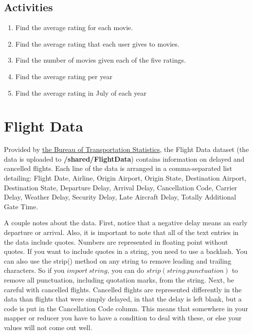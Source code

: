 \documentclass[letterpaper,10pt,openany,oneside]{sphinxmanual}
\begin{document}
\subsection{Activities}
\label{WmrActivities/WmrActivities:id2}\begin{enumerate}
\item {} 
Find the average rating for each movie.

\item {} 
Find the average rating that each user gives to movies.

\item {} 
Find the number of movies given each of the five ratings.

\item {} 
Find the average rating per year

\item {} 
Find the average rating in July of each year

\end{enumerate}


\section{Flight Data}
\label{WmrActivities/WmrActivities:flight-data}
Provided by
\href{http://www.transtats.bts.gov/DL\_SelectFields.asp?Table\_ID=236\&DB\_Short\_Name=On-Time}{the Bureau of Transportation Statistics},
the Flight Data dataset (the data is uploaded to \textbf{/shared/FlightData}) contains information on delayed and
cancelled flights. Each line of the data is arranged in a
comma-separated list detailing: Flight Date, Airline, Origin
Airport, Origin State, Destination Airport, Destination State,
Departure Delay, Arrival Delay, Cancellation Code, Carrier Delay,
Weather Delay, Security Delay, Late Aircraft Delay, Totally
Additional Gate Time.

A couple notes about the data. First, notice that a negative delay
means an early departure or arrival. Also, it is important to note
that all of the text entries in the data include quotes. Numbers
are represented in floating point without quotes. If you want to
include quotes in a string, you need to use a backlash. You can
also use the strip() method on any string to remove leading and
trailing characters. So if you $import \ string$, you can
do $strip(string.punctuation)$ to remove all punctuation,
including quotation marks, from the string. Next, be careful with
cancelled flights. Cancelled flights are represented differently in
the data than flights that were simply delayed, in that the delay
is left blank, but a code is put in the Cancellation Code column.
This means that somewhere in your mapper or reducer you have to
have a condition to deal with these, or else your values will not
come out well.
\end{document}
